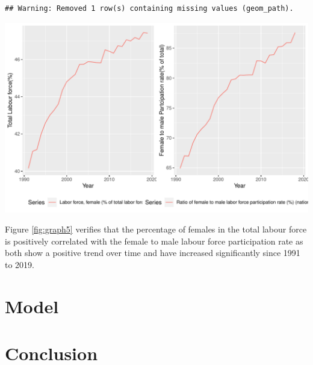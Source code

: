 \documentclass[11pt,a4paper,]{article}
\let\origfigure\figure
\let\endorigfigure\endfigure
\renewenvironment{figure}[1][2] {
    \expandafter\origfigure\expandafter[H]
} {
    \endorigfigure
}%
\begin{document}
\begin{verbatim}
## Warning: Removed 1 row(s) containing missing values (geom_path).
\end{verbatim}

\begin{figure}
\centering
\includegraphics{report_files/figure-latex/graph5-1.pdf}
\caption{\label{fig:graph5}Comparing female labour force with female-male participation rate}
\end{figure}

Figure \ref{fig:graph5} verifies that the percentage of females in the total labour force is positively correlated with the female to male labour force participation rate as both show a positive trend over time and have increased significantly since 1991 to 2019.

\section*{Model}

\section*{Conclusion}

\printbibliography
\end{document}
